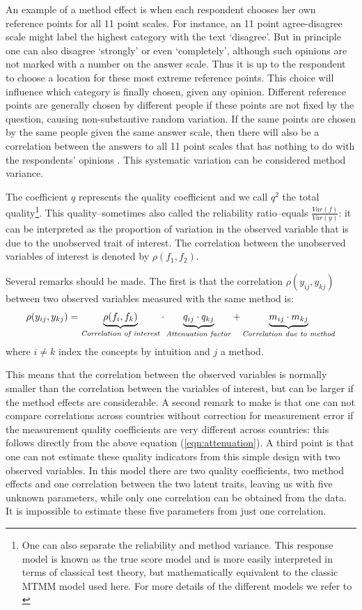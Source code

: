 \documentclass[a4paper,12pt]{article}
\begin{document}
An example of a method effect is when each respondent chooses her own reference points for all 11 point scales.
For instance, an 11 point agree-disagree scale might label the highest category with the text `disagree'. But in principle one can also disagree `strongly' or even `completely', although such opinions are not marked with a number on the answer scale. Thus it is up to the respondent to choose a location for these most extreme reference points. This choice will influence which category is finally chosen, given any opinion.  Different reference points are generally chosen by different people if these points are not fixed by the question, causing non-substantive random variation. If the same points are chosen by the same people given the same answer scale, then there will also be a correlation between the answers to all 11 point scales that has nothing to do with the respondents' opinions \citep{saris_variation_1988}. This systematic variation can be considered method variance.

The coefficient $q$ represents the quality coefficient and we call $q^2$ the total quality\footnote{One can also separate the reliability and method variance. This response model is known as the true score model and is more easily interpreted in terms of classical test theory, but mathematically equivalent to the classic MTMM model used here. For more details of the different models we refer to \citep{saris_evaluation_1991}}.
This quality--sometimes also called the reliability ratio--equals $\frac{Var(f)}{Var(y)}$: it can be interpreted as the proportion of variation in the observed variable that is due to the unobserved trait of interest. The correlation between the unobserved variables of interest is denoted by $\rho(f_1,f_2)$.

Several remarks should be made. The first is that the correlation $\rho(y_{ij}, y_{kj})$ between two observed variables measured with the same method is:
\begin{equation}
\rho(y_{ij}, y_{kj}) = \underbrace{\rho(f_i, f_k)}_{\textrm{\emph{Correlation of interest}}} \cdot \underbrace{q_{ij} \cdot q_{kj}}_{\textrm{\emph{Attenuation factor}}} + \underbrace{m_{ij} \cdot m_{kj}}_{\textrm{\emph{Correlation due to method}}}
\label{eqn:attenuation}\end{equation}
where $i \neq k$ index the concepts by intuition and $j$ a method.

This means that the correlation between the observed variables is normally smaller than the correlation between the variables of interest, but can be larger if the method effects are considerable. A second remark to make is that one can not compare correlations across countries without correction for measurement error if the measurement quality coefficients are very different across countries: this follows directly from the above equation (\ref{eqn:attenuation}). A third point is that one can not estimate these quality indicators from this simple design with two observed variables. In this model there are two quality coefficients, two method effects and one correlation between the two latent traits, leaving us with  five unknown parameters, while only one correlation can be obtained from the data. It is impossible to estimate these five parameters from just one correlation.  
\end{document}
